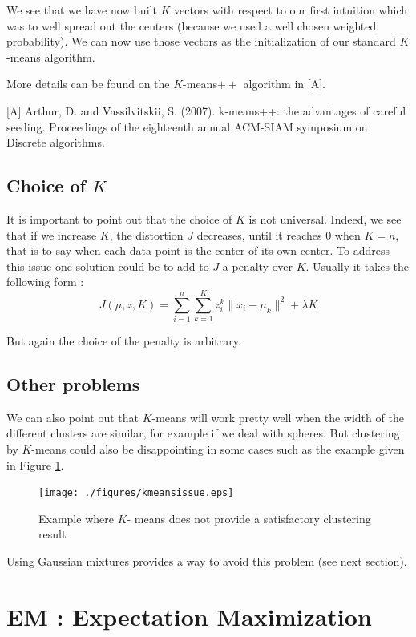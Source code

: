 \documentclass[12pt]{report}
\begin{document}
We see that we have now built $K$ vectors with respect to our first intuition which was to well spread out the centers (because we used a well chosen weighted probability). We can now use those vectors as the initialization of our standard $K$-means algorithm.  

More details can be found on the $K$-means$++$ algorithm in [A].

\vspace*{1cm}

[A] Arthur, D. and Vassilvitskii, S. (2007). k-means++: the advantages of careful seeding. Proceedings of the eighteenth annual ACM-SIAM symposium on Discrete algorithms.


\subsection{Choice of $K$}

It is important to point out that the choice of $K$ is not universal. Indeed, we see that if we increase $K$, the distortion $J$ decreases, until it reaches $0$ when $K=n$, that is to say when each data point is the center of its own center. To address this issue one solution could be to add to $J$ a penalty over $K$. Usually it takes the following form : 
$$ J(\mu,z,K)=\sum_{i=1}^n \sum_{k=1}^K z_i^k \| x_i-\mu_k \|^2 + \lambda K$$

But again the choice of the penalty is arbitrary.
\newpage
\subsection{Other problems}
We can also point out that $K$-means will work pretty well when the width of the different clusters are similar, for example if we deal with spheres. But clustering by $K$-means could also be disappointing in some cases such as the example given in Figure \ref{kmeansissue}.

\begin{figure}[ht]
  
  \centering
  \texttt{[image: ./figures/kmeansissue.eps]}
  \caption{\label{kmeansissue} Example where $K$- means does not provide a satisfactory clustering result}
\end{figure}

Using Gaussian mixtures provides a way to avoid this problem (see next section).

\section{EM : Expectation Maximization}
\end{document}
